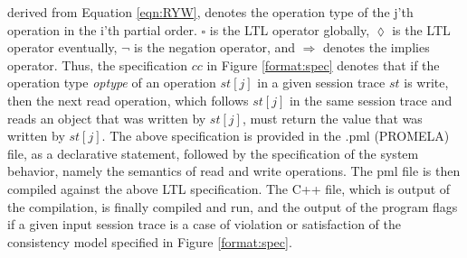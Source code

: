 \documentclass[journal,compsoc]{IEEEtran}
\begin{document}
     derived from Equation \ref{eqn:RYW}, denotes the operation type of the j'th operation in the i'th partial order. $\square$ is the LTL operator globally, $\lozenge$ is the LTL operator eventually, $\lnot$ is the negation operator, and   $\Rightarrow$ denotes the implies operator.  Thus, the specification $cc$ in  Figure \ref{format:spec} denotes that if the operation type \emph{optype} of an operation $st[j]$ in a given session trace $st$ is write, then the next read operation, which follows $st[j]$ in the same session trace and reads an  object that was written by $st[j]$, must return the value that was written by $st[j]$. 
   The above specification is provided in the .pml (PROMELA) file, as a declarative statement, followed by the specification of the system behavior, namely the semantics of read and write operations. The pml file is then compiled against the above LTL specification.  The C++ file, which is output of the compilation, is finally compiled and run, and the output of the program flags if a given input session trace is a case of violation or satisfaction of the consistency model specified in Figure \ref{format:spec}.

\end{document}
